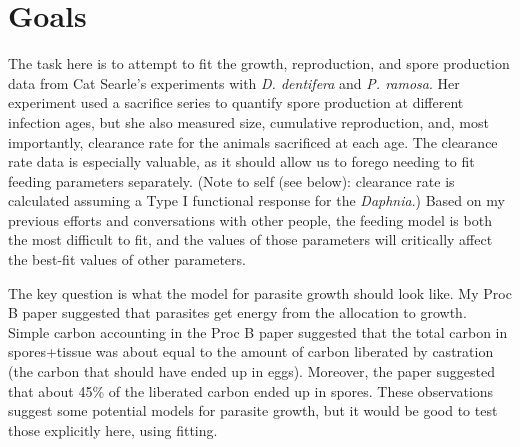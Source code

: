 \documentclass[12pt,reqno,final,pdftex]{amsart}\usepackage[]{graphicx}\usepackage[]{color}
\theoremstyle{plain}
\numberwithin{equation}{part}
\begin{document}
\section*{Goals}
The task here is to attempt to fit the growth, reproduction, and spore production data from Cat Searle's experiments with \emph{D. dentifera} and \emph{P. ramosa}.
Her experiment used a sacrifice series to quantify spore production at different infection ages, but she also measured size, cumulative reproduction, and, most importantly, clearance rate for the animals sacrificed at each age.
The clearance rate data is especially valuable, as it should allow us to forego needing to fit feeding parameters separately.
(Note to self (see below): clearance rate is calculated assuming a Type I functional response for the \emph{Daphnia}.)
Based on my previous efforts and conversations with other people, the feeding model is both the most difficult to fit, and the values of those parameters will critically affect the best-fit values of other parameters.

The key question is what the model for parasite growth should look like.
My Proc B paper suggested that parasites get energy from the allocation to growth.
Simple carbon accounting in the Proc B paper suggested that the total carbon in spores+tissue was about equal to the amount of carbon liberated by castration (the carbon that should have ended up in eggs).
Moreover, the paper suggested that about 45\% of the liberated carbon ended up in spores.
These observations suggest some potential models for parasite growth, but it would be good to test those explicitly here, using fitting.
\end{document}
